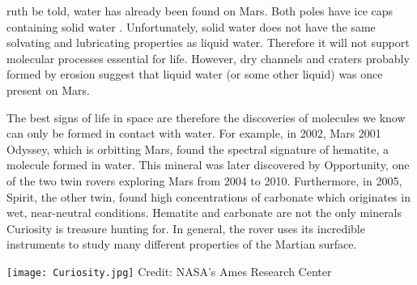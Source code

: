 ruth be told, water has already been found on Mars.
Both poles have ice caps containing solid water \cite{MARSwater}.
Unfortunately, solid water does not have the same solvating and lubricating properties as liquid water. Therefore it will not support molecular processes essential for life.
However, dry channels and craters probably formed by erosion suggest that liquid water (or some other liquid) was once present on Mars.

The best signs of life in space are therefore the discoveries of molecules we know can only be formed in contact with water.
For example, in 2002, Mars 2001 Odyssey, which is orbitting Mars, found the spectral signature of hematite, a molecule formed in water.
This mineral was later discovered by Opportunity, one of the two twin rovers exploring Mars from 2004 to 2010.
Furthermore, in 2005, Spirit, the other twin, found high concentrations of carbonate which originates in wet, near-neutral conditions. 
Hematite and carbonate are not the only minerals Curiosity is treasure hunting for.
In general, the rover uses its incredible instruments to study many different properties of the Martian surface.

\begin{center}
	\texttt{[image: Curiosity.jpg]}
	\tiny{Credit: NASA's Ames Research Center}
\end{center}